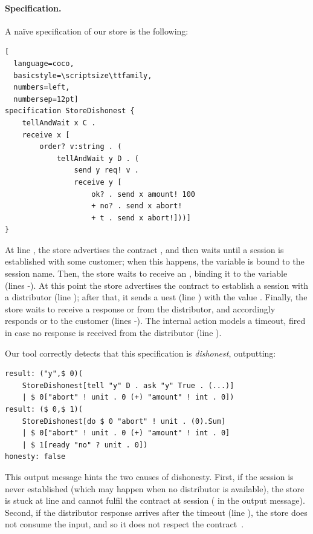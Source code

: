 \paragraph{Specification.}
A naïve \coco specification of our store is the following:
\begin{lstlisting}[
  language=coco,
  basicstyle=\scriptsize\ttfamily,
  numbers=left,
  numbersep=12pt]
specification StoreDishonest {
    tellAndWait x C .
    receive x [
        order? v:string . (
            tellAndWait y D . (
                send y req! v .
                receive y [
                    ok? . send x amount! 100
                    + no? . send x abort!
                    + t . send x abort!]))]
}
\end{lstlisting}

At line , the store advertises the contract ,
and then waits until a session is established with some customer;
when this happens, the variable  is bound to the session name.
Then, the store waits to receive an , 
binding it to the variable  (lines -).
At this point the store advertises the contract 
to establish a session  with a distributor
(line ); 
after that, it sends a uest (line ) with the value .
Finally, the store waits to receive a response  or  from the distributor,
and accordingly responds  or  to the customer 
(lines -). 
The internal action  models a timeout, 
fired in case no response is received from the distributor (line ).

Our tool correctly detects that this specification is \emph{dishonest}, 
outputting:
\begin{lstlisting}[basicstyle=\scriptsize\ttfamily]
result: ("y",$ 0)(
    StoreDishonest[tell "y" D . ask "y" True . (...)] 
    | $ 0["abort" ! unit . 0 (+) "amount" ! int . 0])
result: ($ 0,$ 1)(
    StoreDishonest[do $ 0 "abort" ! unit . (0).Sum] 
    | $ 0["abort" ! unit . 0 (+) "amount" ! int . 0] 
    | $ 1[ready "no" ? unit . 0])
honesty: false
\end{lstlisting}
This output message hints the two causes of dishonesty. 
First, if the session 
is never established (which may happen when no distributor is available), 
the store is stuck at line 
and cannot fulfil the contract  at session  ( in the output message).
Second, if the distributor response arrives after the timeout (line ),
the store does not consume the input, and 
so it does not respect the contract~.

